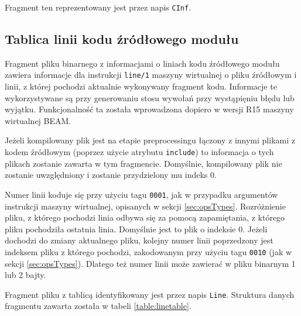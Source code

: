 Fragment ten reprezentowany jest przez napis \texttt{CInf}.

\subsection{Tablica linii kodu źródłowego modułu}
Fragment pliku binarnego z informacjami o liniach kodu źródłowego modułu zawiera informacje dla instrukcji \texttt{line/1} maszyny wirtualnej o pliku źródłowym i linii, z której pochodzi aktualnie wykonywany fragment kodu. Informacje te wykorzystywane są przy generowaniu stosu wywołań przy wystąpięniu błędu lub wyjątku. Funkcjonalność ta została wprowadzona dopiero w wersji R15 maszyny wirtualnej BEAM.

Jeżeli kompilowany plik jest na etapie preprocessingu łączony z innymi plikami z kodem źródłowym (poprzez użycie atrybutu \texttt{include}) to informacja o tych plikach zostanie zawarta w tym fragmencie. Domyślnie, kompilowany plik nie zostanie uwzględniony i zostanie przydzielony mu indeks 0. 

Numer linii koduje się przy użyciu tagu \texttt{0001}, jak w przypadku argumentów instrukcji maszyny wirtualnej, opisanych w sekcji \ref{sec:opsTypes}.
Rozróżnienie pliku, z którego pochodzi linia odbywa się za pomocą zapamiętania, z którego pliku pochodziła ostatnia linia. Domyślnie jest to plik o indeksie 0. Jeżeli dochodzi do zmiany aktualnego pliku, kolejny numer linii poprzedzony jest indeksem pliku z którego pochodzi, zakodowanym przy użyciu tagu \texttt{0010} (jak w sekcji \ref{sec:opsTypes}). Dlatego też numer linii może zawierać w pliku binarnym 1 lub 2 bajty.

Fragment pliku z tablicą identyfikowany jest przez napis \texttt{Line}. Struktura danych fragmentu zawarta została w tabeli \ref{table:linetable}.

